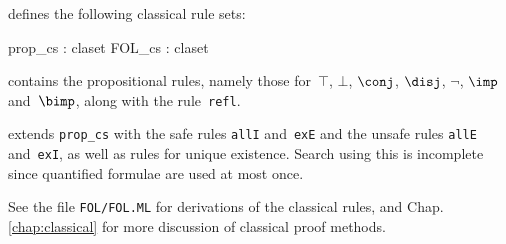 {\FOL} defines the following classical rule sets:
\begin{ttbox} 
prop_cs    : claset
FOL_cs     : claset
\end{ttbox}
\begin{ttdescription}
\item[\ttindexbold{prop_cs}] contains the propositional rules, namely
those for~$\top$, $\bot$, $\conj$, $\disj$, $\neg$, $\imp$ and~$\bimp$,
along with the rule~{\tt refl}.

\item[\ttindexbold{FOL_cs}] 
extends {\tt prop_cs} with the safe rules {\tt allI} and~{\tt exE}
and the unsafe rules {\tt allE} and~{\tt exI}, as well as rules for
unique existence.  Search using this is incomplete since quantified
formulae are used at most once.
\end{ttdescription}
\noindent
See the file {\tt FOL/FOL.ML} for derivations of the
classical rules, and 
%
        {Chap.\ts\ref{chap:classical}} 
for more discussion of classical proof methods.



